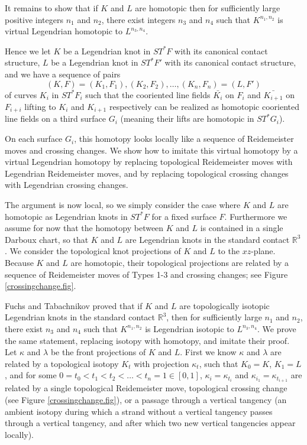 It remains to show that if $K$ and $L$ are homotopic then for sufficiently large positive integers $n_1$ and $n_2$, there exist integers $n_3$ and $n_4$ such that $K^{n_1, n_2}$ is virtual Legendrian homotopic to $L^{n_3,n_4}$.

Hence we let $K$ be a Legendrian knot in $ST^*F$ with its canonical contact structure, $L$ be a Legendrian knot in $ST^*F'$ with its canonical contact structure, and we have a sequence of pairs
$$(K,F)=(K_1,F_1),(K_2,F_2),\dots,(K_n,F_n)=(L,F')$$
of curves $K_i$ in $ST^*F_i$ such that the cooriented line fields $\bar{K_i}$ on $F_i$ and $\bar{K_{i+1}}$ on $F_{i+i}$ lifting to $K_i$ and $K_{i+1}$ respectively can be realized as homotopic cooriented line fields on a third surface $G_i$ (meaning their lifts are homotopic in $ST^*G_i$).  

On each surface $G_i$, this homotopy looks locally like a sequence of Reidemeister moves and crossing changes. We show how to imitate this virtual homotopy by a virtual Legendrian homotopy by replacing topological Reidemeister moves with Legendrian Reidemeister moves, and by replacing topological crossing changes with Legendrian crossing changes.
 
The argument is now local, so we simply consider the case where $K$ and $L$ are homotopic as Legendrian knots in $ST^*F$ for a fixed surface $F$.  Furthermore we assume for now that the homotopy between $K$ and $L$ is contained in a single Darboux chart, so that $K$ and $L$ are Legendrian knots in the standard contact $\mathbb{R}^3$.  We consider the topological knot projections of $K$ and $L$ to the $xz$-plane.  Because $K$ and $L$ are homotopic, their topological projections are related by a sequence of Reidemeister moves of Types 1-3 and crossing changes; see Figure \ref{crossingchange.fig}.

Fuchs and Tabachnikov \cite{f&t} proved that if $K$ and $L$ are topologically isotopic Legendrian knots in the standard contact $\mathbb{R}^3$, then  for sufficiently large $n_1$ and $n_2$, there exist  $n_3$ and $n_4$ such that $K^{n_1, n_2}$ is Legendrian isotopic to $L^{n_3, n_4}$.  We prove the same statement, replacing isotopy with homotopy, and imitate their proof.  Let $\kappa$ and $\lambda$ be the front projections of $K$ and $L$. First we know $\kappa$ and $\lambda$ are related by a topological isotopy $K_t$ with projection $\kappa_t$, such that $K_0=K$, $K_1=L$, and for some $0=t_0<t_1< t_2 < \dots <t_n=1 \in [0,1]$, $\kappa_i=\kappa_{t_i}$ and $\kappa_{i_1}=\kappa_{t_{i+1}}$ are related by a single topological Reidemeister move, topological crossing change (see Figure \ref{crossingchange.fig}), or a passage through a vertical tangency (an ambient isotopy during which a strand without a vertical tangency passes through a vertical tangency, and after which two new vertical tangencies appear locally).

